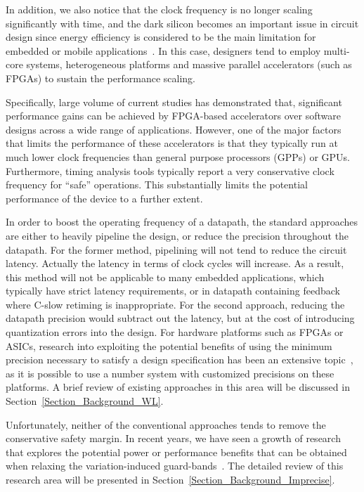\documentclass[journal]{IEEEtran}
\begin{document}
In addition, we also notice that the clock frequency is no longer scaling significantly with time, and the dark silicon becomes an important issue in circuit design since energy efficiency is considered to be the main limitation for embedded or mobile applications~\cite{FutureMicroprocessor2005,DarkSilicon2011}. In this case, designers tend to employ multi-core systems, heterogeneous platforms and massive parallel accelerators (such as FPGAs) to sustain the performance scaling.

Specifically, large volume of current studies has demonstrated that, significant performance gains can be achieved by FPGA-based accelerators over software designs across a wide range of applications. However, one of the major factors that limits the performance of these accelerators is that they typically run at much lower clock frequencies than general purpose processors (GPPs) or GPUs. Furthermore, timing analysis tools typically report a very conservative clock frequency for ``safe'' operations. This substantially limits the potential performance of the device to a further extent.

In order to boost the operating frequency of a datapath, the standard approaches are either to heavily pipeline the design, or reduce the precision throughout the datapath. For the former method, pipelining will not tend to reduce the circuit latency. Actually the latency in terms of clock cycles will increase. As a result, this method will not be applicable to many embedded applications, which typically have strict latency requirements, or in datapath containing feedback where C-slow retiming is inappropriate. For the second approach, reducing the datapath precision would subtract out the latency, but at the cost of introducing quantization errors into the design. For hardware platforms such as FPGAs or ASICs, research into exploiting the potential benefits of using the minimum precision necessary to satisfy a design specification has been an extensive topic~\cite{GeorgeDT11}, as it is possible to use a number system with customized precisions on these platforms. A brief review of existing approaches in this area will be discussed in Section~\ref{Section_Background_WL}.

Unfortunately, neither of the conventional approaches tends to remove the conservative safety margin. In recent years, we have seen a growth of research that explores the potential power or performance benefits that can be obtained when relaxing the variation-induced guard-bands~\cite{NewBox2004}. The detailed review of this research area will be presented in Section~\ref{Section_Background_Imprecise}.
\end{document}
